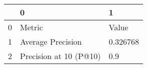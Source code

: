 \begin{tabular}{lll}
\toprule
{} &                       0 &         1 \\
\midrule
0 &                  Metric &     Value \\
1 &       Average Precision &  0.326768 \\
2 &  Precision at 10 (P@10) &       0.9 \\
\bottomrule
\end{tabular}
